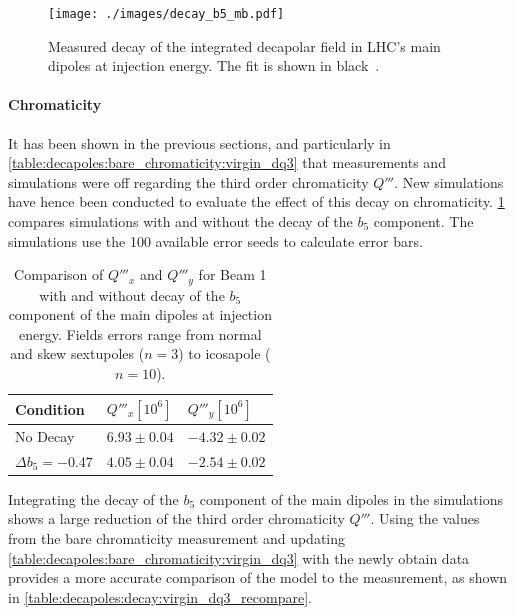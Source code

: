 \begin{figure}[!htb]
    \centering
    \texttt{[image: ./images/decay\_b5\_mb.pdf]}
    \caption{Measured decay of the integrated decapolar field in LHC's main dipoles at injection
    energy. The fit is shown in black~\cite{deniau_magnetic_2009}.}
    \label{fig:decapoles:decay:decay_b5}
\end{figure}



\paragraph{Chromaticity}
It has been shown in the previous sections, and particularly in
\cref{table:decapoles:bare_chromaticity:virgin_dq3} that measurements and simulations were off
regarding the third order chromaticity $Q'''$.
New simulations have hence been conducted to evaluate the effect of this decay on chromaticity.
\cref{table:decapoles:decay:simulation_chromaticity} compares simulations with and
without the decay of the $b_5$ component. The simulations use the 100 available error seeds to
calculate error bars.

\begin{table}[!htb]
    \centering
    \begin{tabular}{lll}
      \toprule
      Condition            & $Q'''_x [10^6]$ & $Q'''_y [10^6]$ \\
      \midrule
      No Decay             & $6.93 \pm 0.04$ & $-4.32 \pm 0.02$ \\
      $\Delta b_5 = -0.47$ & $4.05 \pm 0.04$ & $-2.54 \pm 0.02 $ \\
      \bottomrule
    \end{tabular}
    \caption{Comparison of $Q'''_x$ and $Q'''_y$ for Beam 1 with and without decay of the $b_5$
    component of the main dipoles at injection energy. Fields errors range from normal and skew
    sextupoles ($n=3$) to icosapole ($n=10$).}
    \label{table:decapoles:decay:simulation_chromaticity}
  \end{table}

Integrating the decay of the $b_5$ component of the main dipoles in the simulations shows a large
reduction of the third order chromaticity $Q'''$.
Using the values from the bare chromaticity measurement and updating
\cref{table:decapoles:bare_chromaticity:virgin_dq3} with the newly obtain data provides a more
accurate comparison of the model to the measurement, as shown in
\cref{table:decapoles:decay:virgin_dq3_recompare}.


